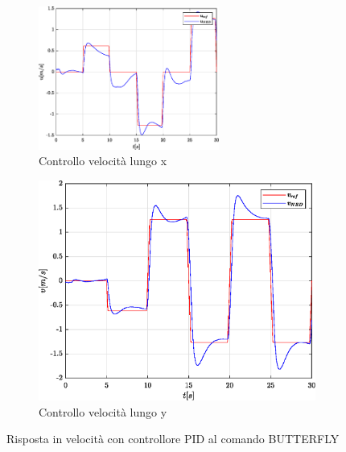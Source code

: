 \begin{figure}
	\centering
	\begin{subfigure}{0.45\textwidth}
		\centering
		\includegraphics[width=0.65\textwidth]{Simulazioni/Figure/PID/BUTTERFLY/PositionControlXVel}
		\caption{Controllo velocità lungo x}
		\label{fig:BUTTERFLYerrvelxPID}
	\end{subfigure}
	\hfill
	\begin{subfigure}{0.45\textwidth}
		\centering
		\includegraphics[width=1\textwidth]{Simulazioni/Figure/PID/BUTTERFLY/PositionControlYVel}
		\caption{Controllo velocità lungo y}
		\label{fig:BUTTERFLYerrvelyPID}
	\end{subfigure}
		\caption{Risposta in velocità con controllore PID al comando BUTTERFLY}
\end{figure}

